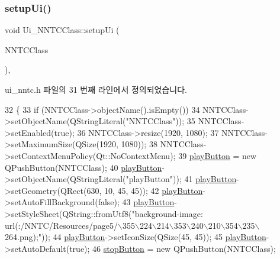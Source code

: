 \subsubsection{\texorpdfstring{setup\+Ui()}{setupUi()}}
{\footnotesize\ttfamily void Ui\+\_\+\+N\+N\+T\+C\+Class\+::setup\+Ui (\begin{DoxyParamCaption}\item[{Q\+Dialog $\ast$}]{N\+N\+T\+C\+Class }\end{DoxyParamCaption})\hspace{0.3cm}{\ttfamily [inline]}, {\ttfamily [inherited]}}



ui\+\_\+nntc.\+h 파일의 31 번째 라인에서 정의되었습니다.


\begin{DoxyCode}
32     \{
33         \textcolor{keywordflow}{if} (NNTCClass->objectName().isEmpty())
34             NNTCClass->setObjectName(QStringLiteral(\textcolor{stringliteral}{"NNTCClass"}));
35         NNTCClass->setEnabled(\textcolor{keyword}{true});
36         NNTCClass->resize(1920, 1080);
37         NNTCClass->setMaximumSize(QSize(1920, 1080));
38         NNTCClass->setContextMenuPolicy(Qt::NoContextMenu);
39         \mbox{\hyperlink{class_ui___n_n_t_c_class_a6e604f467f5d7264f8d23f0cf54a6fdf}{playButton}} = \textcolor{keyword}{new} QPushButton(NNTCClass);
40         \mbox{\hyperlink{class_ui___n_n_t_c_class_a6e604f467f5d7264f8d23f0cf54a6fdf}{playButton}}->setObjectName(QStringLiteral(\textcolor{stringliteral}{"playButton"}));
41         \mbox{\hyperlink{class_ui___n_n_t_c_class_a6e604f467f5d7264f8d23f0cf54a6fdf}{playButton}}->setGeometry(QRect(630, 10, 45, 45));
42         \mbox{\hyperlink{class_ui___n_n_t_c_class_a6e604f467f5d7264f8d23f0cf54a6fdf}{playButton}}->setAutoFillBackground(\textcolor{keyword}{false});
43         \mbox{\hyperlink{class_ui___n_n_t_c_class_a6e604f467f5d7264f8d23f0cf54a6fdf}{playButton}}->setStyleSheet(QString::fromUtf8(\textcolor{stringliteral}{"background-image:
       url(:/NNTC/Resources/page5/\(\backslash\)355\(\backslash\)224\(\backslash\)214\(\backslash\)353\(\backslash\)240\(\backslash\)210\(\backslash\)354\(\backslash\)235\(\backslash\)264.png);"}));
44         \mbox{\hyperlink{class_ui___n_n_t_c_class_a6e604f467f5d7264f8d23f0cf54a6fdf}{playButton}}->setIconSize(QSize(45, 45));
45         \mbox{\hyperlink{class_ui___n_n_t_c_class_a6e604f467f5d7264f8d23f0cf54a6fdf}{playButton}}->setAutoDefault(\textcolor{keyword}{true});
46         \mbox{\hyperlink{class_ui___n_n_t_c_class_a748e190a62458531e66a574cc556e32d}{stopButton}} = \textcolor{keyword}{new} QPushButton(NNTCClass);

\end{DoxyCode}
